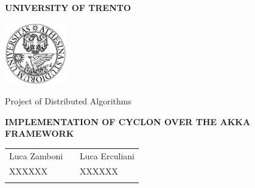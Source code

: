 \begin{center}
	{\bfseries\Huge {UNIVERSITY OF TRENTO}}

	\begin{center}
		\includegraphics[width=0.2\textwidth]{img/unitn}
	\end{center}
	\vspace{0.5cm}
	{\Large Project of Distributed Algorithms}
	\vspace{0.2cm}

	{ \bfseries \Large {IMPLEMENTATION OF CYCLON OVER THE AKKA FRAMEWORK}}
	\vspace{2.0cm}
	\large
	\begin{center}
		\begin{tabular}{lcl}
			Luca Zamboni & \hspace{5cm} &  Luca Erculiani \\
			XXXXXX & \hspace{6cm} &  XXXXXX \\ \\
		\end{tabular}
	\end{center}
	\vspace{1.0cm}
\end{center}